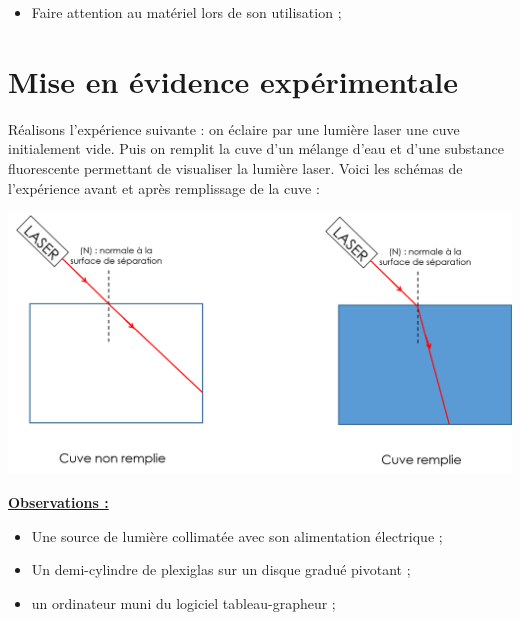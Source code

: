 \begin{tcolorbox}[colback=red!5!white,colframe=red!75!black,title= Consignes :]
\begin{itemize}
    \item Faire attention au matériel lors de son utilisation ;
\end{itemize}
\end{tcolorbox}

\section{Mise en évidence expérimentale}
\begin{tcolorbox}[colback=orange!5!white,colframe=orange!75!black,title= Expérience introductive :]
Réalisons l'expérience suivante : on éclaire par une lumière laser une cuve initialement vide. Puis on remplit la cuve d'un mélange d'eau et d'une substance fluorescente permettant de visualiser la lumière laser. Voici les schémas de l'expérience avant et après remplissage de la cuve :
\begin{center}
    \includegraphics[scale=0.4]{Images/Experience_intro_correc.png}
\end{center}
\textbf{\underline{Observations :}}

\end{tcolorbox}


\begin{mdframed}[style=autreexo]
\textbf{}
\begin{itemize}
    \item Une source de lumière collimatée avec son alimentation électrique ;
    \item Un demi-cylindre de plexiglas sur un disque gradué pivotant ;
    \item un ordinateur muni du logiciel tableau-grapheur ;
\end{itemize}
\end{mdframed}

